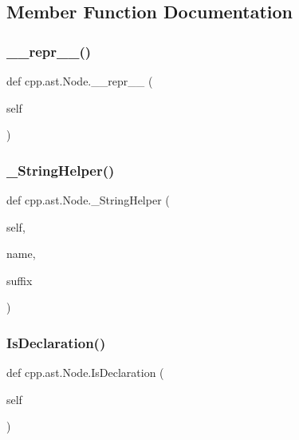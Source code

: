 \subsection{Member Function Documentation}
\mbox{\label{classcpp_1_1ast_1_1_node_ab89915656a60c7b7c752e5baa607c532}} 
\subsubsection{\texorpdfstring{\_\_repr\_\_()}{\_\_repr\_\_()}}
{\footnotesize\ttfamily def cpp.\+ast.\+Node.\+\_\+\+\_\+repr\+\_\+\+\_\+ (\begin{DoxyParamCaption}\item[{}]{self }\end{DoxyParamCaption})}

\mbox{\label{classcpp_1_1ast_1_1_node_acb9507fa368fa5d6045a9eb9a0a8c3d3}} 
\subsubsection{\texorpdfstring{\_StringHelper()}{\_StringHelper()}}
{\footnotesize\ttfamily def cpp.\+ast.\+Node.\+\_\+\+String\+Helper (\begin{DoxyParamCaption}\item[{}]{self,  }\item[{}]{name,  }\item[{}]{suffix }\end{DoxyParamCaption})\hspace{0.3cm}{\ttfamily [private]}}

\mbox{\label{classcpp_1_1ast_1_1_node_ab3eca703a79fb65bc25dfbcb7547c79e}} 
\subsubsection{\texorpdfstring{IsDeclaration()}{IsDeclaration()}}
{\footnotesize\ttfamily def cpp.\+ast.\+Node.\+Is\+Declaration (\begin{DoxyParamCaption}\item[{}]{self }\end{DoxyParamCaption})}

